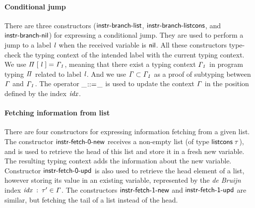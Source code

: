 \documentclass[review]{elsarticle}
\theoremstyle{definition}
\newcommand{\D}[1]{\blue{\mathsf{#1}}}
\newcommand{\Con}[1]{\red{\mathsf{#1}}}
\newcommand{\F}[1]{\green{\mathsf{#1}}}
\newcommand{\V}[1]{\purple{\mathit{#1}}}
\begin{document}
\paragraph{Conditional jump}{There are three constructors (\ensuremath{\Con{instr\textrm{-}branch\textrm{-}list}},
\ensuremath{\Con{instr\textrm{-}branch\textrm{-}listcons}}, and \ensuremath{\Con{instr\textrm{-}branch\textrm{-}nil}}) for expressing a conditional
jump. They are used to perform a jump to a label \ensuremath{\V{l}} when the received variable is \ensuremath{\Con{nil}}.
All these constructors type-check the typing context of the intended label with the
current typing context. We use \ensuremath{\V{\Pi}\;\D{[}\;\V{l}\;\D{]=}\;\V{\Gamma_1}}, meaning that there exist a typing context
\ensuremath{\V{\Gamma_1}} in program typing \ensuremath{\V{\Pi}} related to label \ensuremath{\V{l}}. And we use \ensuremath{\V{\Gamma}\;\D{\subset}\;\V{\Gamma_1}} as a proof of
subtyping between \ensuremath{\V{\Gamma}} and \ensuremath{\V{\Gamma_1}}. The operator \ensuremath{\F{\_\hspace{-2pt}::=\hspace{-2pt}\_}} is used to update the context \ensuremath{\V{\Gamma}}
in the position defined by the index \ensuremath{\V{idx}}.}

\paragraph{Fetching information from list}{There are four constructors for expressing
information fetching from a given list. The constructor \ensuremath{\Con{instr\textrm{-}fetch\textrm{-}0\textrm{-}new}} receives a
non-empty list (of type \ensuremath{\Con{listcons}\;\V{\tau}}), and is used to retrieve the head of this list and store it
in a fresh new variable. The resulting typing context adds the information about the new
variable. Constructor \ensuremath{\Con{instr\textrm{-}fetch\textrm{-}0\textrm{-}upd}} is also used to retrieve the head element of a
list, however storing its value in an existing variable, represented by the \emph{de Bruijn}
index \ensuremath{\V{idx}\;\mathbin{:}\;\V{\tau'}\;\D{\in}\;\V{\Gamma}}. The constructors \ensuremath{\Con{instr\textrm{-}fetch\textrm{-}1\textrm{-}new}} and \ensuremath{\Con{instr\textrm{-}fetch\textrm{-}1\textrm{-}upd}}
are similar, but fetching the tail of a list instead of the head.}
\end{document}
